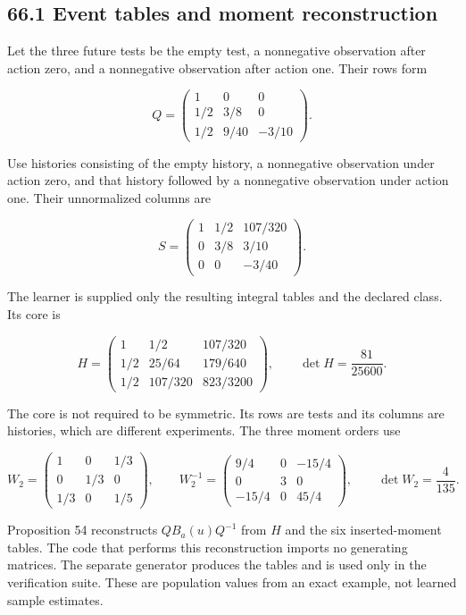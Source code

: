 \documentclass[11pt,letterpaper]{article}
\begin{document}
\subsection{66.1 Event tables and moment
reconstruction}\label{event-tables-and-moment-reconstruction}

Let the three future tests be the empty test, a nonnegative observation
after action zero, and a nonnegative observation after action one. Their
rows form

\[
Q=\begin{pmatrix}
1&0&0\\
1/2&3/8&0\\
1/2&9/40&-3/10
\end{pmatrix}.
\]

Use histories consisting of the empty history, a nonnegative observation
under action zero, and that history followed by a nonnegative
observation under action one. Their unnormalized columns are

\[
S=\begin{pmatrix}
1&1/2&107/320\\
0&3/8&3/10\\
0&0&-3/40
\end{pmatrix}.
\]

The learner is supplied only the resulting integral tables and the
declared class. Its core is

\[
\boxed{
H=\begin{pmatrix}
1&1/2&107/320\\
1/2&25/64&179/640\\
1/2&107/320&823/3200
\end{pmatrix},\qquad\det H=\frac{81}{25600}.
}
\]

The core is not required to be symmetric. Its rows are tests and its
columns are histories, which are different experiments. The three moment
orders use

\[
W_2=\begin{pmatrix}1&0&1/3\\0&1/3&0\\1/3&0&1/5\end{pmatrix},
\qquad
W_2^{-1}=\begin{pmatrix}9/4&0&-15/4\\0&3&0\\-15/4&0&45/4\end{pmatrix},
\qquad\det W_2=\frac4{135}.
\]

Proposition 54 reconstructs \(QB_a(u)Q^{-1}\) from \(H\) and the six
inserted-moment tables. The code that performs this reconstruction
imports no generating matrices. The separate generator produces the
tables and is used only in the verification suite. These are population
values from an exact example, not learned sample estimates.
\end{document}
